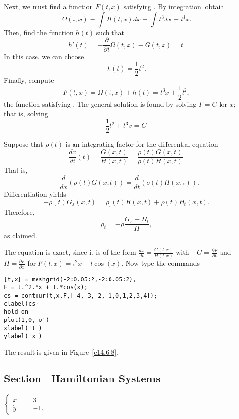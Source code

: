 Next, we must find a function $F(t,x)$ satisfying .
By integration, obtain
\[
\Omega(t,x) = \int H(t,x)dx = \int t^3dx = t^3x.
\]
Then, find the function $h(t)$ such that
\[
h'(t) = -\frac{\partial}{\partial t}\Omega(t,x) - G(t,x)
= t.
\]
In this case, we can choose 
\[
h(t) =  \frac{1}{2}t^2.  
\]
Finally, compute
\[
F(t,x) = \Omega(t,x) + h(t) = t^3x + \frac{1}{2}t^2,
\]
the function satisfying .  The general solution is found by 
solving $F=C$ for $x$; that is, solving
\[
\frac{1}{2}t^2 + t^3x = C.
\]

Suppose that $\rho(t)$ is an integrating factor for the differential equation
\[
\frac{dx}{dt}(t) = \frac{G(x,t)}{H(x,t)}=\frac{\rho(t)G(x,t)}{\rho(t)H(x,t)}.
\]
That is,
\[
-\frac{d}{dx}(\rho(t)G(x,t)) = \frac{d}{dt}(\rho(t)H(x,t)).
\]
Differentiation yields
\[
-\rho(t)G_x(x,t) = \rho_t(t)H(x,t) + \rho(t)H_t(x,t).
\]
Therefore,
\begin{equation} \label{EX:if}
\rho_t = -\rho\frac{G_x+H_t}{H},
\end{equation}
as claimed.

  The equation is exact, since it is of the form
$\frac{dx}{dt} = \frac{G(t,x)}{H(t,x)}$ with
$-G=\frac{\partial F}{\partial t}$ and
$H=\frac{\partial F}{\partial x}$ for $F(t,x) = t^2 x + t\cos(x)$.
Now type the commands
\begin{verbatim}
[t,x] = meshgrid(-2:0.05:2,-2:0.05:2);
F = t.^2.*x + t.*cos(x);
cs = contour(t,x,F,[-4,-3,-2,-1,0,1,2,3,4]);
clabel(cs)
hold on
plot(1,0,'o')
xlabel('t')
ylabel('x')
\end{verbatim}
The result is given in Figure~\ref{c14.6.8}.

\begin{figure}[htb]
     \centerline{%
     }
\end{figure} 



\subsection*{Section~\protect{\ref{sec:HamSys}} Hamiltonian Systems}

 \ans $\left\{\begin{array}{rcl}
	\dot{x} & = & 3 \\ \dot{y} & = & -1. \end{array}\right.$

